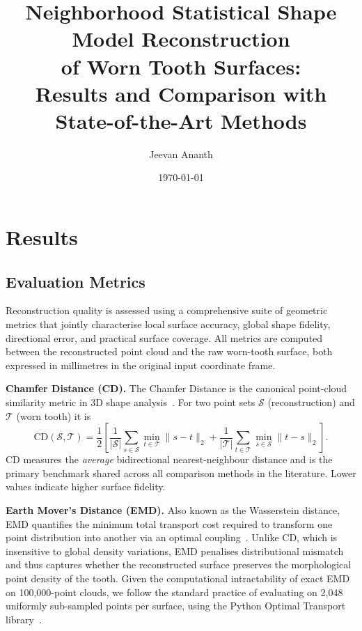 \documentclass[11pt,a4paper]{article}
\title{Neighborhood Statistical Shape Model Reconstruction\\
       of Worn Tooth Surfaces:\\
       Results and Comparison with State-of-the-Art Methods}
\author{Jeevan Ananth}
\date{\today}
\begin{document}
\maketitle
\tableofcontents
\newpage

\section{Results}
\label{sec:results}

\subsection{Evaluation Metrics}
\label{sec:metrics}

Reconstruction quality is assessed using a comprehensive suite of
geometric metrics that jointly characterise local surface accuracy,
global shape fidelity, directional error, and practical surface
coverage.  All metrics are computed between the reconstructed point
cloud and the raw worn-tooth surface, both expressed in millimetres
in the original input coordinate frame.

\medskip
\textbf{Chamfer Distance (CD).}
The Chamfer Distance is the canonical point-cloud similarity metric
in 3D shape analysis~\cite{fan2017point}.  For two point sets
$\mathcal{S}$ (reconstruction) and $\mathcal{T}$ (worn tooth) it is
\begin{equation}
  \mathrm{CD}(\mathcal{S},\mathcal{T}) =
    \frac{1}{2}\!\left[
      \frac{1}{|\mathcal{S}|}\sum_{s\in\mathcal{S}}\min_{t\in\mathcal{T}}\|s-t\|_2
      +
      \frac{1}{|\mathcal{T}|}\sum_{t\in\mathcal{T}}\min_{s\in\mathcal{S}}\|t-s\|_2
    \right].
  \label{eq:cd}
\end{equation}
CD measures the \emph{average} bidirectional nearest-neighbour
distance and is the primary benchmark shared across all comparison
methods in the literature.  Lower values indicate higher surface
fidelity.

\medskip
\textbf{Earth Mover's Distance (EMD).}
Also known as the Wasserstein distance, EMD quantifies the minimum
total transport cost required to transform one point distribution
into another via an optimal coupling~\cite{rubner2000earth}.
Unlike CD, which is insensitive to global density variations, EMD
penalises distributional mismatch and thus captures whether the
reconstructed surface preserves the morphological point density of
the tooth.  Given the computational intractability of exact EMD on
100{,}000-point clouds, we follow the standard practice of
evaluating on 2{,}048 uniformly sub-sampled points per surface,
using the Python Optimal Transport library~\cite{flamary2021pot}.
\end{document}
